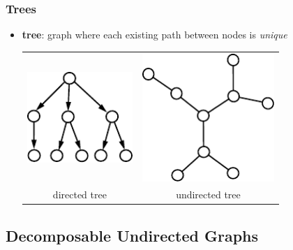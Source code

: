 \begin{frame} \frametitle{Trees}
	\begin{itemize}
	\item\textbf{tree}: graph where each existing path 
			between nodes is \emph{unique}
	
	\vspace{2mm}
	\begin{center}
	\begin{tabular}{cc}
		\includegraphics[width=4cm]{img/tree_directed}
		&
		\hspace{-5mm}
		\includegraphics[width=5cm]{img/tree_undirected} \\
		directed tree & \hspace{-5mm} undirected tree 
	\end{tabular}
	\end{center}
	\end{itemize}
\end{frame}

\subsection{Decomposable Undirected Graphs}

